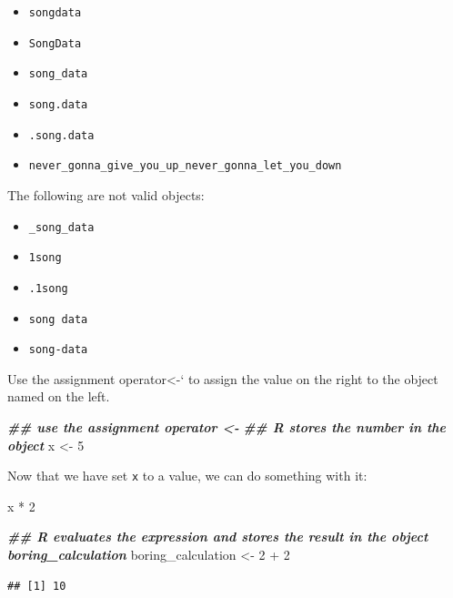 \documentclass[
  oneside]{book}
\newenvironment{Shaded}{\begin{snugshade}}{\end{snugshade}}
\newcommand{\DecValTok}[1]{\textcolor[rgb]{0.00,0.00,0.81}{#1}}
\newcommand{\DocumentationTok}[1]{\textcolor[rgb]{0.56,0.35,0.01}{\textbf{\textit{#1}}}}
\newcommand{\NormalTok}[1]{#1}
\newcommand{\OtherTok}[1]{\textcolor[rgb]{0.56,0.35,0.01}{#1}}
\newcommand{\SpecialCharTok}[1]{\textcolor[rgb]{0.00,0.00,0.00}{#1}}
\providecommand{\tightlist}{%
  \setlength{\itemsep}{0pt}\setlength{\parskip}{0pt}}
\begin{document}
\begin{itemize}
\tightlist
\item
  \texttt{songdata}
\item
  \texttt{SongData}
\item
  \texttt{song\_data}
\item
  \texttt{song.data}
\item
  \texttt{.song.data}
\item
  \texttt{never\_gonna\_give\_you\_up\_never\_gonna\_let\_you\_down}
\end{itemize}

The following are not valid objects:

\begin{itemize}
\tightlist
\item
  \texttt{\_song\_data}
\item
  \texttt{1song}
\item
  \texttt{.1song}
\item
  \texttt{song\ data}
\item
  \texttt{song-data}
\end{itemize}

Use the assignment operator\textless-` to assign the value on the right to the object named on the left.

\begin{Shaded}
\begin{Highlighting}[]
\DocumentationTok{\#\# use the assignment operator \textquotesingle{}\textless{}{-}\textquotesingle{}}
\DocumentationTok{\#\# R stores the number in the object}
\NormalTok{x }\OtherTok{\textless{}{-}} \DecValTok{5}
\end{Highlighting}
\end{Shaded}

Now that we have set \texttt{x} to a value, we can do something with it:

\begin{Shaded}
\begin{Highlighting}[]
\NormalTok{x }\SpecialCharTok{*} \DecValTok{2}

\DocumentationTok{\#\# R evaluates the expression and stores the result in the object boring\_calculation}
\NormalTok{boring\_calculation }\OtherTok{\textless{}{-}} \DecValTok{2} \SpecialCharTok{+} \DecValTok{2}
\end{Highlighting}
\end{Shaded}

\begin{verbatim}
## [1] 10
\end{verbatim}
\end{document}
